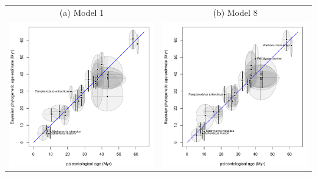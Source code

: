 \documentclass{standalone}
\begin{document}
\begin{tabular}{cc}
(a) Model 1 & (b) Model 8 \\
\includegraphics[width=7cm]{run1_2/1_phyloAgeVsGeoAge.pdf} 
& 
\includegraphics[width=7cm]{run8_5/8_phyloAgeVsGeoAge.pdf}
\\
\end{tabular}
\end{document}
